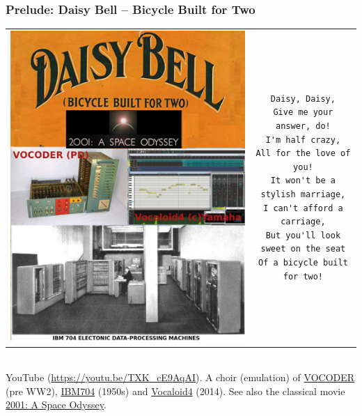 \documentclass[aspectratio=169, xcolor=table, notheorems, hyperref={pdfpagelabels=false}]{beamer}
\begin{document}
\begin{frame}[fragile]
\frametitle{Prelude: Daisy Bell -- Bicycle Built for Two}
\begin{tabular}{cc}
\begin{minipage}{45mm}
\vspace{1pt}
\includegraphics[width=0.89\linewidth]{os-daisybell}
\end{minipage}
&
\begin{minipage}{65mm}
\vspace{1pt}
\begin{verbatim}
Daisy, Daisy,
Give me your answer, do!
I'm half crazy,
All for the love of you!
It won't be a stylish marriage,
I can't afford a carriage,
But you'll look sweet on the seat
Of a bicycle built for two!
\end{verbatim}
\end{minipage}
\\
\end{tabular}
\\[5mm]

YouTube {\footnotesize  (\url{https://youtu.be/TXK_cE9AqAI})}.
A choir (emulation) of 
\href{https://youtu.be/TXK_cE9AqAI?t=68}{VOCODER}
(pre WW2), 
\href{https://youtu.be/TXK_cE9AqAI?t=99}{IBM704}
(1950s) and 
\href{https://youtu.be/TXK_cE9AqAI?t=130}{Vocaloid4}
(2014).
See also the classical movie \href{https://youtu.be/oR\_e9y-bka0}{2001: A Space Odyssey}. 
\end{frame}
\end{document}
